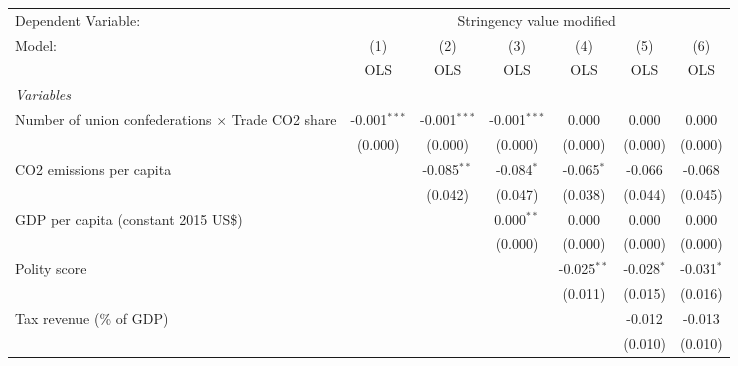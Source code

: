 
\begingroup
\centering
\begin{tabular}{lcccccc}
   \toprule
   Dependent Variable: & \multicolumn{6}{c}{Stringency value modified}\\
   Model:                                                   & (1)            & (2)            & (3)            & (4)           & (5)          & (6)\\  
                                                            &  OLS           & OLS            & OLS            & OLS           & OLS          & OLS\\  
   \midrule
   \emph{Variables}\\
   Number of union confederations $\times$ Trade CO2 share  & -0.001$^{***}$ & -0.001$^{***}$ & -0.001$^{***}$ & 0.000         & 0.000        & 0.000\\   
                                                            & (0.000)        & (0.000)        & (0.000)        & (0.000)       & (0.000)      & (0.000)\\   
   CO2 emissions per capita                                 &                & -0.085$^{**}$  & -0.084$^{*}$   & -0.065$^{*}$  & -0.066       & -0.068\\   
                                                            &                & (0.042)        & (0.047)        & (0.038)       & (0.044)      & (0.045)\\   
   GDP per capita (constant 2015 US\$)                      &                &                & 0.000$^{**}$   & 0.000         & 0.000        & 0.000\\   
                                                            &                &                & (0.000)        & (0.000)       & (0.000)      & (0.000)\\   
   Polity score                                             &                &                &                & -0.025$^{**}$ & -0.028$^{*}$ & -0.031$^{*}$\\   
                                                            &                &                &                & (0.011)       & (0.015)      & (0.016)\\   
   Tax revenue (\% of GDP)                                  &                &                &                &               & -0.012       & -0.013\\   
                                                            &                &                &                &               & (0.010)      & (0.010)\\   

\end{tabular}
